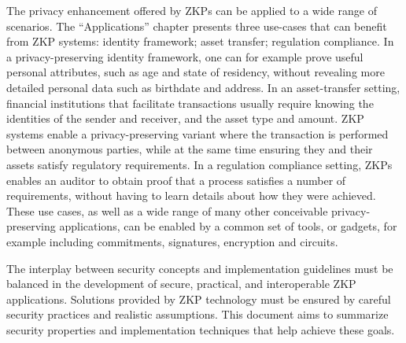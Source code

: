 	The privacy enhancement offered by ZKPs can be applied to a wide range of scenarios.  
	The ``Applications'' chapter presents three use-cases that can benefit from ZKP systems: identity framework; asset transfer; regulation compliance. 
	In a privacy-preserving identity framework, one can for example prove useful personal attributes, such as age and state of residency, without revealing more detailed personal data such as birthdate and address.
	In an asset-transfer setting, financial institutions that facilitate transactions usually require knowing the identities of the sender and receiver, and the asset type and amount. 
	ZKP systems enable a privacy-preserving variant where the transaction is performed between anonymous parties, while at the same time ensuring they and their assets satisfy regulatory requirements.
	In a regulation compliance setting, ZKPs enables an auditor to obtain proof that a process satisfies a number of requirements, without having to learn details about how they were achieved.
	These use cases, as well as a wide range of many other conceivable privacy-preserving applications, can be enabled by a common set of tools, or gadgets, for example including commitments, signatures, encryption and circuits.
\loosen


	The interplay between security concepts and implementation guidelines must be balanced in %
the development of secure, practical, and interoperable ZKP applications.
	Solutions provided by ZKP technology must be ensured by careful security practices and realistic assumptions.
	This document aims to summarize security properties and implementation techniques that help achieve these goals.
		